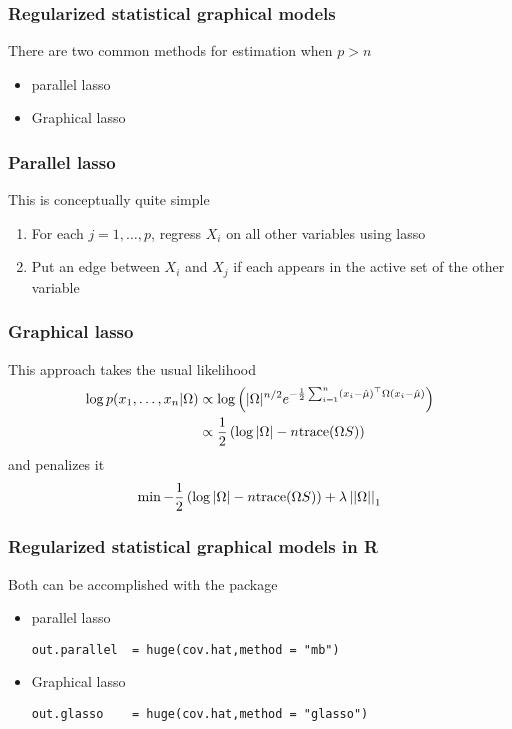 \documentclass[12pt]{beamer}
\begin{document}
\begin{frame}[fragile]
\frametitle{Regularized statistical graphical models}
There are two common methods for estimation when $p > n$
\begin{itemize}
\item parallel lasso

\item Graphical lasso

\end{itemize}
\end{frame}

\begin{frame}[fragile]
\frametitle{Parallel lasso}
This is conceptually quite simple

\begin{enumerate}
\item For each $j = 1,\ldots, p$, regress $X_i$ on all other variables using lasso
\item Put an edge between $X_i$ and $X_j$ if each appears in the active set of the other variable
\end{enumerate}
\end{frame}

\begin{frame}[fragile]
\frametitle{Graphical lasso}
This approach takes the usual likelihood
\begin{align*}
\log p(x_1,\ldots,x_n|\Omega)
&  \propto \log \left( |\Omega|^{n/2} e^{ -\frac{1}{2} \sum_{i=1}^n (x_i - \hat\mu)^{\top}\Omega(x_i - \hat\mu)}\right)\\
&  \propto \frac{1}{2}\left( \log |\Omega| - n\textrm{trace}(\Omega S)\right)
\end{align*}
 and penalizes it
 \[
 \min -\frac{1}{2}\left( \log |\Omega| - n\textrm{trace}(\Omega S)\right) + \lambda \left|\left| \Omega \right|\right|_1
 \]
\end{frame}

\begin{frame}[fragile]
\frametitle{Regularized statistical graphical models in R}
Both can be accomplished with the  package
\begin{itemize}
\item parallel lasso
\begin{verbatim}
out.parallel  = huge(cov.hat,method = "mb")
\end{verbatim}

\item Graphical lasso
\begin{verbatim}
out.glasso    = huge(cov.hat,method = "glasso")
\end{verbatim}

\end{itemize}
\end{frame}
\end{document}
